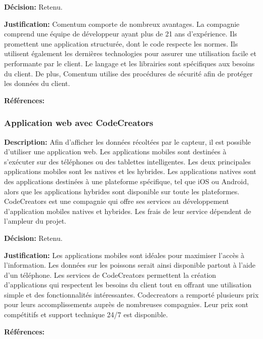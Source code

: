 \textbf{Décision:} Retenu.

\textbf{Justification:} Comentum comporte de nombreux avantages. La compagnie comprend une équipe de développeur ayant plus de 21 ans d'expérience. Ils promettent une application structurée, dont le code respecte les normes. Ils utilisent également les dernières technologies pour assurer une utilisation facile et performante par le client. Le langage et les librairies sont spécifiques aux besoins du client. De plus, Comentum utilise des procédures de sécurité afin de protéger les données du client.

\textbf{Références:} \cite{Comentum} \cite{Tizen}

\subsubsection{Application web avec CodeCreators}

\textbf{Description:} Afin d'afficher les données récoltées par le capteur, il est possible d'utiliser une application web. Les applications mobiles sont destinées à s'exécuter sur des téléphones ou des tablettes intelligentes. Les deux principales applications mobiles sont les natives et les hybrides. Les applications natives sont des applications destinées à une plateforme spécifique, tel que iOS ou Android, alors que les applications hybrides sont disponible sur toute les plateformes. CodeCreators est une compagnie qui offre ses services au développement d'application mobiles natives et hybrides. Les frais de leur service dépendent de l'ampleur du projet.

\textbf{Décision:} Retenu.

\textbf{Justification:} Les applications mobiles sont idéales pour maximiser l'accès à l'information. Les données sur les poissons serait ainsi disponible partout à l'aide d'un téléphone. Les services de CodeCreators permettent la création d'applications qui respectent les besoins du client tout en offrant une utilisation simple et des fonctionnalités intéressantes. Codecreators a remporté plusieurs prix pour leurs accomplissements auprès de nombreuses compagnies. Leur prix sont compétitifs et support technique 24/7 est disponible.

\textbf{Références:} \cite{CodeCreators} \cite{CodeCreators2}

